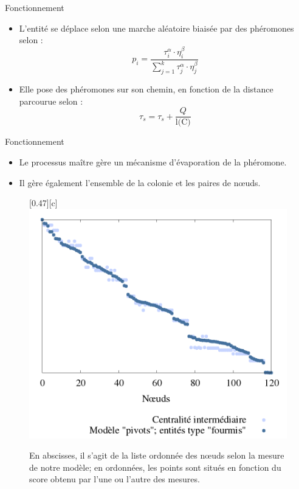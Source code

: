 \documentclass{beamer}
\begin{document}
\begin{frame}
	\begin{block}{Fonctionnement}
		\begin{itemize}
		    \item L'entité se déplace selon une marche aléatoire biaisée par des phéromones selon :
$$
	p_i = \frac{\tau_{i}^{\alpha}\cdot \eta_{i}^{\beta}}{ \sum\limits_{j=1}^{k}\tau_{j}^{\alpha}\cdot \eta_{j}^{\beta}}
$$

		    \pause \item Elle pose des phéromones sur son chemin, en fonction de la distance parcourue selon :
$$
	\tau_s = \tau_s + \frac{Q}{\text{l(C)}}
$$
		\end{itemize}
	\end{block}
\end{frame}

\begin{frame}
	\begin{block}{Fonctionnement}
		\begin{itemize}
		    \item Le processus maître gère un mécanisme d'évaporation de la phéromone.
		    \item Il gère également l'ensemble de la colonie et les paires de n\oe uds.
		\end{itemize}
	\end{block}
\end{frame}

\begin{frame}
	\begin{figure}[htbp]
		\centering
		[0.47\linewidth][c]{
			\includegraphics[width=0.47\linewidth]{./img/pivots_fourmis_grille_10.png}
		}
		\caption{En abscisses, il s'agit de la liste ordonnée des n\oe uds selon la mesure de notre modèle; en ordonnées, les points sont situés en fonction du score obtenu par l'une ou l'autre des mesures.}
		\label{fig:graphiques_pivots_astar}
	\end{figure}
\end{frame}
\end{document}
